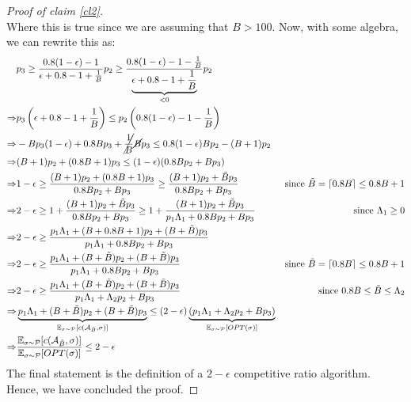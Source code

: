 \documentclass[11pt]{article}
\begin{document}
\begin{enumerate}
\begin{proof}[Proof of claim \ref{cl2}]
\begin{equation*}
        \end{equation*}
        Where this is true since we are assuming that $B > 100$. Now, with some algebra, we can rewrite this as:
        \begin{align*}
            & p_3 \geq \frac{0.8(1-\epsilon)-1}{\epsilon + 0.8 - 1 + \frac{1}{B}}p_2 \geq \frac{0.8(1-\epsilon)-1-\frac{1}{B}}{\underbrace{\epsilon + 0.8 - 1 + \frac{1}{B}}_{<0}}p_2 \\
            \Rightarrow & p_3\left(\epsilon + 0.8 - 1 + \frac{1}{B}\right) \leq p_2 \left(0.8(1-\epsilon)-1-\frac{1}{B}\right)\\
            \Rightarrow & -Bp_3(1-\epsilon) + 0.8Bp_3 + \cancel{\frac{1}{B}}\cancel{B}p_3 \leq 0.8(1-\epsilon)Bp_2 -(B+1)p_2\\
            \Rightarrow& (B+1)p_2 + (0.8B+1)p_3 \leq (1-\epsilon)(0.8Bp_2 + Bp_3)\\
            \Rightarrow& 1-\epsilon \geq \frac{(B+1)p_2 + (0.8B + 1)p_3}{0.8Bp_2 + Bp_3} \geq \frac{(B+1)p_2 + \tilde{B}p_3}{0.8Bp_2 + Bp_3} & \text{since }\tilde{B} = \lceil 0.8B\rceil \leq 0.8B + 1\\
            \Rightarrow& 2-\epsilon \geq 1 +  \frac{(B+1)p_2 + \tilde{B}p_3}{0.8Bp_2 + Bp_3} \geq 1 +  \frac{(B+1)p_2  + \tilde{B}p_3}{p_1\Lambda_1 + 0.8Bp_2 + Bp_3} & \text{since }\Lambda_1 \geq 0\\
            \Rightarrow& 2-\epsilon \geq \frac{p_1 \Lambda_1 + (B + 0.8B + 1)p_2 + (B+\tilde B)p_3}{p_1\Lambda_1 + 0.8Bp_2 + Bp_3}\\
            \Rightarrow& 2-\epsilon \geq \frac{p_1 \Lambda_1 + (B+\tilde B)p_2 + (B+\tilde B)p_3}{p_1\Lambda_1 + 0.8Bp_2 + Bp_3} &  \text{since }\tilde{B} = \lceil 0.8B\rceil \leq 0.8B + 1 \\
            \Rightarrow& 2-\epsilon \geq \frac{p_1 \Lambda_1 + (B+\tilde B)p_2 + (B+\tilde B)p_3}{p_1\Lambda_1 + \Lambda_2p_2 + Bp_3} &  \text{since }0.8B \leq \tilde{B} \leq \Lambda_2\\
            \Rightarrow& \underbrace{p_1 \Lambda_1 + (B+\tilde B)p_2 + (B+\tilde B)p_3}_{\mathbb{E}_{\sigma \sim \mathcal{P}}[c(\mathcal{A}_{\tilde B}, \sigma)]} \leq (2-\epsilon)\underbrace{(p_1\Lambda_1 + \Lambda_2p_2 + Bp_3)}_{\mathbb{E}_{\sigma \sim \mathcal{P}}[OPT(\sigma)]}\\
            \Rightarrow& \frac{\mathbb{E}_{\sigma \sim \mathcal{P}}[c(\mathcal{A}_{\tilde B}, \sigma)]}{\mathbb{E}_{\sigma \sim \mathcal{P}}[OPT(\sigma)]} \leq 2-\epsilon
        \end{align*}
        The final statement is the definition of a $2-\epsilon$ competitive ratio algorithm. Hence, we have concluded the proof.
    \end{proof}


\end{enumerate}
\end{document}
